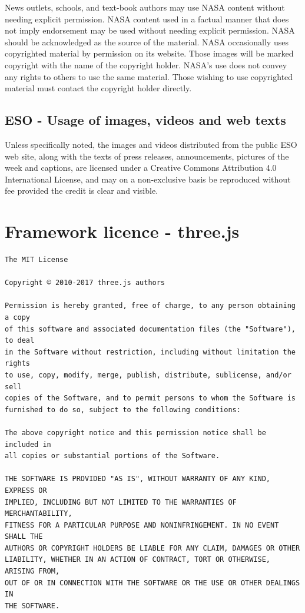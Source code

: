 \documentclass[twoside]{bhamthesis}
\begin{document}
News outlets, schools, and text-book authors may use NASA content without needing explicit permission. NASA content used in a factual manner that does not imply endorsement may be used without needing explicit permission. NASA should be acknowledged as the source of the material. NASA occasionally uses copyrighted material by permission on its website. Those images will be marked copyright with the name of the copyright holder. NASA's use does not convey any rights to others to use the same material. Those wishing to use copyrighted material must contact the copyright holder directly.

\subsection{ESO - Usage of images, videos and web texts}

Unless specifically noted, the images and videos distributed from the public ESO web site, along with the texts of press releases, announcements, pictures of the week and captions, are licensed under a Creative Commons Attribution 4.0 International License, and may on a non-exclusive basis be reproduced without fee provided the credit is clear and visible.

\newpage

\section{Framework licence - three.js}

\begin{verbatim}
The MIT License

Copyright © 2010-2017 three.js authors

Permission is hereby granted, free of charge, to any person obtaining a copy
of this software and associated documentation files (the "Software"), to deal
in the Software without restriction, including without limitation the rights
to use, copy, modify, merge, publish, distribute, sublicense, and/or sell
copies of the Software, and to permit persons to whom the Software is
furnished to do so, subject to the following conditions:

The above copyright notice and this permission notice shall be included in
all copies or substantial portions of the Software.

THE SOFTWARE IS PROVIDED "AS IS", WITHOUT WARRANTY OF ANY KIND, EXPRESS OR
IMPLIED, INCLUDING BUT NOT LIMITED TO THE WARRANTIES OF MERCHANTABILITY,
FITNESS FOR A PARTICULAR PURPOSE AND NONINFRINGEMENT. IN NO EVENT SHALL THE
AUTHORS OR COPYRIGHT HOLDERS BE LIABLE FOR ANY CLAIM, DAMAGES OR OTHER
LIABILITY, WHETHER IN AN ACTION OF CONTRACT, TORT OR OTHERWISE, ARISING FROM,
OUT OF OR IN CONNECTION WITH THE SOFTWARE OR THE USE OR OTHER DEALINGS IN
THE SOFTWARE.
\end{verbatim}

\declaration
\end{document}
